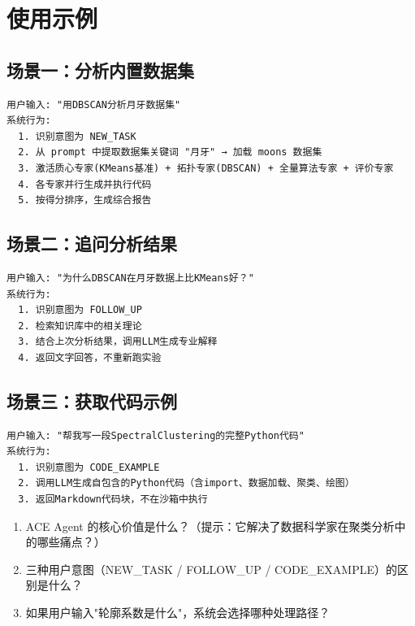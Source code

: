 \documentclass[11pt,a4paper]{ctexbook}
\begin{document}
\section{使用示例}

\subsection{场景一：分析内置数据集}
\begin{verbatim}
用户输入: "用DBSCAN分析月牙数据集"
系统行为:
  1. 识别意图为 NEW_TASK
  2. 从 prompt 中提取数据集关键词 "月牙" → 加载 moons 数据集
  3. 激活质心专家(KMeans基准) + 拓扑专家(DBSCAN) + 全量算法专家 + 评价专家
  4. 各专家并行生成并执行代码
  5. 按得分排序，生成综合报告
\end{verbatim}

\subsection{场景二：追问分析结果}
\begin{verbatim}
用户输入: "为什么DBSCAN在月牙数据上比KMeans好？"
系统行为:
  1. 识别意图为 FOLLOW_UP
  2. 检索知识库中的相关理论
  3. 结合上次分析结果，调用LLM生成专业解释
  4. 返回文字回答，不重新跑实验
\end{verbatim}

\subsection{场景三：获取代码示例}
\begin{verbatim}
用户输入: "帮我写一段SpectralClustering的完整Python代码"
系统行为:
  1. 识别意图为 CODE_EXAMPLE
  2. 调用LLM生成自包含的Python代码（含import、数据加载、聚类、绘图）
  3. 返回Markdown代码块，不在沙箱中执行
\end{verbatim}

\begin{reviewbox}
    \begin{enumerate}
        \item ACE Agent 的核心价值是什么？（提示：它解决了数据科学家在聚类分析中的哪些痛点？）
        \item 三种用户意图（NEW\_TASK / FOLLOW\_UP / CODE\_EXAMPLE）的区别是什么？
        \item 如果用户输入"轮廓系数是什么"，系统会选择哪种处理路径？
    \end{enumerate}
\end{reviewbox}

\end{document}
